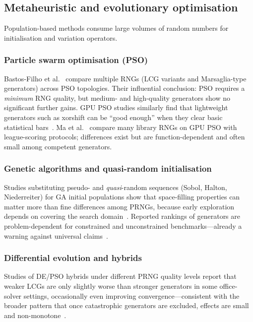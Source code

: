 \subsection{Metaheuristic and evolutionary optimisation}

Population-based methods consume large volumes of random numbers for initialisation and variation operators.

\subsubsection{Particle swarm optimisation (PSO)}

Bastos-Filho et al.~\cite{bastos2009pso} compare multiple RNGs (LCG variants and Marsaglia-type generators) across PSO topologies.
Their influential conclusion: PSO requires a \emph{minimum} RNG quality, but medium- and high-quality generators show no significant further gains.
GPU PSO studies similarly find that lightweight generators such as xorshift can be ``good enough'' when they clear basic statistical bars~\cite{bastos2010gpupso}.
Ma et al.~\cite{ma2014comparison} compare many library RNGs on GPU PSO with league-scoring protocols; differences exist but are function-dependent and often small among competent generators.

\subsubsection{Genetic algorithms and quasi-random initialisation}

Studies substituting pseudo- and \emph{quasi}-random sequences (Sobol, Halton, Niederreiter) for GA initial populations show that space-filling properties can matter more than fine differences among PRNGs, because early exploration depends on covering the search domain~\cite{cantu2008rngga,maaranen2004quasi}.
Reported rankings of generators are problem-dependent for constrained and unconstrained benchmarks---already a warning against universal claims~\cite{cantu2008rngga}.

\subsubsection{Differential evolution and hybrids}

Studies of DE/PSO hybrids under different PRNG quality levels report that weaker LCGs are only slightly worse than stronger generators in some office-solver settings, occasionally even improving convergence---consistent with the broader pattern that once catastrophic generators are excluded, effects are small and non-monotone~\cite{angelova2021de}.


